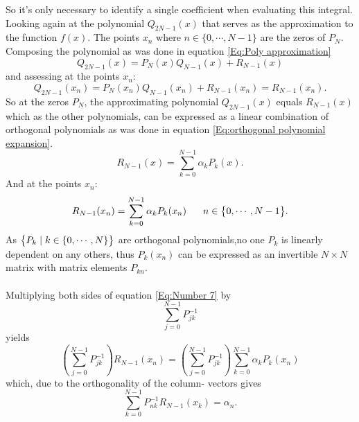 \documentclass[10pt,a4paper]{article}
\begin{document}
So it's only necessary to identify a single coefficient when evaluating this integral.\\Looking again at the polynomial $Q_{2N-1}(x)$ that serves as the approximation to the function $f(x)$. The points $x_n$ where $n \in \big\{0,\cdots,N-1\big\}$ are the zeros of $P_N$. Composing the polynomial as was done in equation \ref{Eq:Poly approximation}
\begin{equation*}
Q_{2N-1}(x) = P_N(x)Q_{N-1}(x)+R_{N-1}(x)
\end{equation*}
and assessing at the points $x_n$:
\begin{equation}\label{Eq:Q2n_1 and Rn_1}
Q_{2N-1}(x_n) = P_N(x_n)Q_{N-1}(x_n)+R_{N-1}(x_n) = R_{N-1}(x_n).
\end{equation}
So at the zeros $P_N$, the approximating polynomial $Q_{2N-1}(x)$ equals $R_{N-1}(x)$ which as the other polynomials, can be expressed as a linear combination of orthogonal polynomials as was done in equation \ref{Eq:orthogonal polynomial expansion}.
\begin{equation*}
R_{N-1}(x) = \sum\limits_{k=0}^{N-1} \alpha_k P_k(x).
\end{equation*} 
And at the points $x_n$:
\begin{equation}\label{Eq:Number 7}
R_{N-1}(x_n) = \sum\limits_{k=0}^{N-1} \alpha_k P_k(x_n)\hspace{6mm}n \in \big\{0,\cdots,N-1\big\}.
\end{equation}
As $\big\{ P_k\hspace{1mm}|\hspace{1mm} k \in \{0,\cdots,N\} \big\}$ are orthogonal polynomials,no one $P_k$ is linearly dependent on any others, thus $P_k(x_n)$ can be expressed as an invertible $N\times N$ matrix with matrix elements $P_{kn}$.\\\\Multiplying both sides of equation \ref{Eq:Number 7} by 
\begin{equation}
\sum\limits_{j=0}^{N-1}P_{jk}^{-1}
\end{equation}
yields
\begin{equation*}
\left( \sum\limits_{j=0}^{N-1}P_{jk}^{-1} \right)R_{N-1}(x_n) = \left( \sum\limits_{j=0}^{N-1}P_{jk}^{-1} \right)\sum\limits_{k=0}^{N-1} \alpha_k P_k(x_n)
\end{equation*}
which, due to the orthogonality of the column- vectors gives
\begin{equation}\label{Eq: for the coefficients a}
\sum\limits_{k=0}^{N-1}P_{nk}^{-1}R_{N-1}(x_k) = \alpha_n.
\end{equation}
\end{document}
